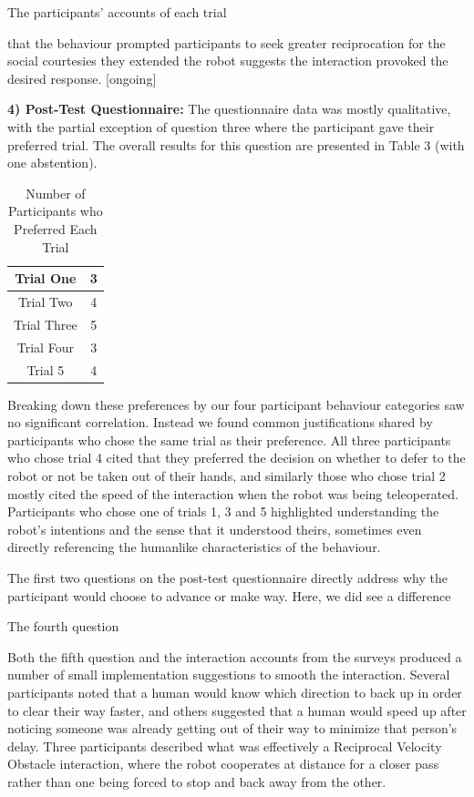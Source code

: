 \documentclass[letterpaper, 10 pt, conference]{ieeeconf}  %
\begin{document}
The participants’ accounts of each trial 





that the behaviour prompted participants to seek greater reciprocation for the social courtesies they extended the robot suggests the interaction provoked the desired response. [ongoing]

\textbf{4) Post-Test Questionnaire:} The questionnaire data was mostly qualitative, with the partial exception of question three where the participant gave their preferred trial. The overall results for this question are presented in Table 3 (with one abstention).

\begin{table}[h]
\caption{Number of Participants who Preferred Each Trial }
\label{Preferemces}
\begin{center}
\begin{tabular}{|c||c|}
\hline
Trial One & 3\\
\hline
Trial Two & 4\\
\hline
Trial Three & 5\\
\hline
Trial Four & 3\\
\hline
Trial 5 & 4\\
\hline
\end{tabular}
\end{center}
\end{table}

Breaking down these preferences by our four participant behaviour categories saw no significant correlation. Instead we found common justifications shared by participants who chose the same trial as their preference. All three participants who chose trial 4 cited that they preferred the decision on whether to defer to the robot or not be taken out of their hands, and similarly those who chose trial 2 mostly cited the speed of the interaction when the robot was being teleoperated. Participants who chose one of trials 1, 3 and 5 highlighted understanding the robot's intentions and the sense that it understood theirs, sometimes even directly referencing the humanlike characteristics of the behaviour.

The first two questions on the post-test questionnaire directly address why the participant would choose to advance or make way. Here, we did see a difference 

The fourth question

Both the fifth question and the interaction accounts from the surveys produced a number of small implementation suggestions to smooth the interaction. Several participants noted that a human would know which direction to back up in order to clear their way faster, and others suggested that a human would speed up after noticing someone was already getting out of their way to minimize that person's delay. Three participants described what was effectively a Reciprocal Velocity Obstacle interaction, where the robot cooperates at distance for a closer pass rather than one being forced to stop and back away from the other. 
\end{document}
